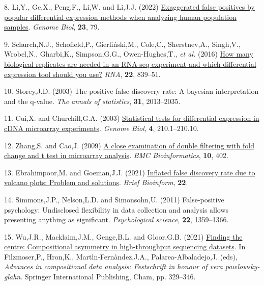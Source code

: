 \documentclass[
]{article}
\newlength{\cslhangindent}
\newenvironment{CSLReferences}[2] %
 {\begin{list}{}{%
  \setlength{\itemindent}{0pt}
  \setlength{\leftmargin}{0pt}
  \setlength{\parsep}{0pt}
  \ifodd #1
   \setlength{\leftmargin}{\cslhangindent}
   \setlength{\itemindent}{-1\cslhangindent}
  \fi
  \setlength{\itemsep}{#2\baselineskip}}}
 {\end{list}}
\begin{document}
\begin{CSLReferences}{1}{1}
8. Li,Y., Ge,X., Peng,F., Li,W. and Li,J.J. (2022)
\href{https://doi.org/10.1186/s13059-022-02648-4}{Exaggerated false
positives by popular differential expression methods when analyzing
human population samples}. \emph{Genome Biol}, \textbf{23}, 79.

9. Schurch,N.J., Schofield,P., Gierliński,M., Cole,C., Sherstnev,A.,
Singh,V., Wrobel,N., Gharbi,K., Simpson,G.G., Owen-Hughes,T., \emph{et
al.} (2016) \href{https://doi.org/10.1261/rna.053959.115}{How many
biological replicates are needed in an RNA-seq experiment and which
differential expression tool should you use?} \emph{RNA}, \textbf{22},
839--51.

10. Storey,J.D. (2003) The positive false discovery rate: A bayesian
interpretation and the q-value. \emph{The annals of statistics},
\textbf{31}, 2013--2035.

11. Cui,X. and Churchill,G.A. (2003)
\href{https://www.ncbi.nlm.nih.gov/pubmed/12702200}{Statistical tests
for differential expression in cDNA microarray experiments}.
\emph{Genome Biol}, \textbf{4}, 210.1--210.10.

12. Zhang,S. and Cao,J. (2009)
\href{https://doi.org/10.1186/1471-2105-10-402}{A close examination of
double filtering with fold change and t test in microarray analysis}.
\emph{BMC Bioinformatics}, \textbf{10}, 402.

13. Ebrahimpoor,M. and Goeman,J.J. (2021)
\href{https://doi.org/10.1093/bib/bbab053}{Inflated false discovery rate
due to volcano plots: Problem and solutions}. \emph{Brief Bioinform},
\textbf{22}.

14. Simmons,J.P., Nelson,L.D. and Simonsohn,U. (2011) False-positive
psychology: Undisclosed flexibility in data collection and analysis
allows presenting anything as significant. \emph{Psychological science},
\textbf{22}, 1359--1366.

15. Wu,J.R., Macklaim,J.M., Genge,B.L. and Gloor,G.B. (2021)
\href{https://doi.org/10.1007/978-3-030-71175-7_17}{Finding the centre:
Compositional asymmetry in high-throughput sequencing datasets}. In
Filzmoser,P., Hron,K., Martìn-Fernàndez,J.A., Palarea-Albaladejo,J.
(eds), \emph{Advances in compositional data analysis: Festschrift in
honour of vera pawlowsky-glahn}. Springer International Publishing,
Cham, pp. 329--346.


\end{CSLReferences}
\end{document}
